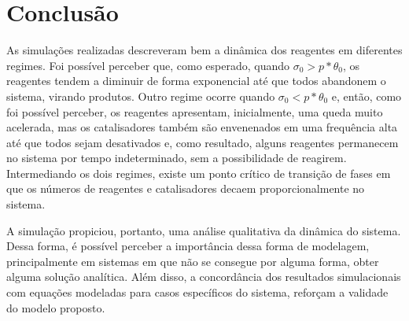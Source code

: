 
\section{Conclusão}

As simulações realizadas descreveram bem a dinâmica dos reagentes em diferentes regimes. Foi possível perceber que, como esperado, quando $\sigma_0 > p*\theta_0$, os reagentes tendem a diminuir de forma exponencial até que todos abandonem o sistema, virando produtos. Outro regime ocorre quando $\sigma_0 < p*\theta_0$ e, então, como foi possível perceber, os reagentes apresentam, inicialmente, uma queda muito acelerada, mas os catalisadores também são envenenados em uma frequência alta até que todos sejam desativados e, como resultado, alguns reagentes permanecem no sistema por tempo indeterminado, sem a possibilidade de reagirem. Intermediando os dois regimes, existe um ponto crítico de transição de fases em que os números de reagentes e catalisadores decaem proporcionalmente no sistema.

A simulação propiciou, portanto, uma análise qualitativa da dinâmica do sistema. Dessa forma, é possível perceber a importância dessa forma de modelagem, principalmente em sistemas em que não se consegue por alguma forma, obter alguma solução analítica. Além disso, a concordância dos resultados simulacionais com equações modeladas para casos específicos do sistema, reforçam a validade do modelo proposto.  